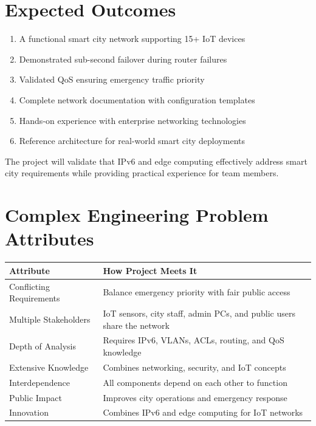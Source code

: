 \documentclass[12pt,a4paper]{article}
\begin{document}
\section*{Expected Outcomes}
{}
\begin{enumerate}[label=7.\arabic*, nosep]
    \item A functional smart city network supporting 15+ IoT devices
    \item Demonstrated sub-second failover during router failures
    \item Validated QoS ensuring emergency traffic priority
    \item Complete network documentation with configuration templates
    \item Hands-on experience with enterprise networking technologies
    \item Reference architecture for real-world smart city deployments
\end{enumerate}

The project will validate that IPv6 and edge computing effectively address smart city requirements while providing practical experience for team members.

\section*{Complex Engineering Problem Attributes}
{}

\begin{center}
\renewcommand{\arraystretch}{1.2}
\begin{tabularx}{\textwidth}{|p{4.2cm}|X|}
\hline
\textbf{Attribute} & \textbf{How Project Meets It} \\
\hline
Conflicting Requirements & Balance emergency priority with fair public access \\
\hline
Multiple Stakeholders & IoT sensors, city staff, admin PCs, and public users share the network \\
\hline
Depth of Analysis & Requires IPv6, VLANs, ACLs, routing, and QoS knowledge \\
\hline
Extensive Knowledge & Combines networking, security, and IoT concepts \\
\hline
Interdependence & All components depend on each other to function \\
\hline
Public Impact & Improves city operations and emergency response \\
\hline
Innovation & Combines IPv6 and edge computing for IoT networks \\
\hline
\end{tabularx}
\end{center}
\end{document}
